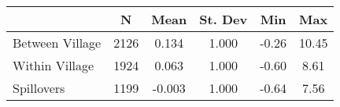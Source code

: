 \begin{tabular}{l*{5}{c}}\hline&\multicolumn{1}{c}{N}&\multicolumn{1}{c}{Mean}&\multicolumn{1}{c}{St. Dev}&\multicolumn{1}{c}{Min}&\multicolumn{1}{c}{Max}\\ \hline 
Between Village & 2126 & 0.134 & 1.000 & -0.26 & 10.45 \\
Within Village & 1924 & 0.063 & 1.000 & -0.60 & 8.61 \\
Spillovers & 1199 & -0.003 & 1.000 & -0.64 & 7.56 \\
\hline \end{tabular}
